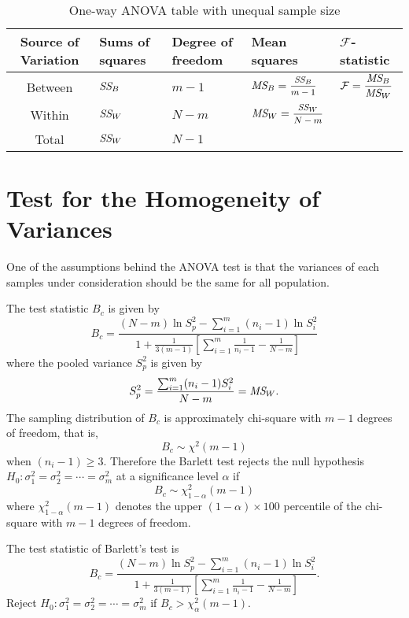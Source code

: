 \begin{table}[h!]
\renewcommand{\arraystretch}{1.2}
\begin{tabularx}{\textwidth}{c|l l p{2.5cm} p{2.5cm}}
    Source of Variation & Sums of squares & Degree of freedom & Mean squares & $\mathcal{F}$-statistic \\[0.6em]
    \hline
    Between & $\textit{SS}_{B}$ & $m - 1$ & $\MS{B} = \mfrac{\CS{B}}{m-1}$ & $\displaystyle \mathcal{F} = \frac{\textit{MS}_{B} }{\textit{MS}_{W} }$ \\[0.6em]
    Within & $\textit{SS}_{W}$ & $N - m$ & $\MS{W} = \mfrac{\CS{W}}{N-m}$ & \\
    \hline
    Total & $\textit{SS}_{W}$ & $N - 1$ & & \\
\end{tabularx}
\caption{One-way ANOVA table with unequal sample size}
\end{table}

\section{Test for the Homogeneity of Variances}

One of the assumptions behind the ANOVA test is that the variances 
of each samples under consideration should be the same for all population.

The test statistic $B_c$ is given by
\begin{equation}
    B_c = \frac{(N -m) \ln S^2_p - \sum^m_{i=1} (n_i - 1) \ln S^2_i }{\displaystyle 1 + \frac{1}{3(m-1)} 
    \left[ \sum^m_{i=1} \frac{1}{n_i - 1} - \frac{1}{N - m} \right]}
\end{equation}
where the pooled variance $S^2_p$ is given by
\begin{equation}
    S^2_p = \frac{\sum^m_{i=1} (n_i - 1) S^2_i}{N - m} = \textit{MS}_{W}.
\end{equation}
The sampling distribution of $B_c$ is approximately chi-square with $m - 1$ degrees of freedom, that is,
\[
    B_c \sim \chi^2 (m-1)
\]
when $(n_i - 1) \geq 3$. Therefore the Barlett test rejects the null hypothesis 
$H_0 : \sigma^2_1 = \sigma^2_2 = \cdots = \sigma^2_m$ at a significance level $\alpha$ if 
\[
    B_c \sim \chi^2_{1 - \alpha} (m-1)
\]
where $\chi^2_{1 - \alpha} (m-1)$ denotes the upper $(1 - \alpha) \times 100$ percentile of the chi-square 
with $m-1$ degrees of freedom.

\begin{definition}
    The test statistic of Barlett's test is 
    \begin{equation}
        B_c = \frac{(N -m) \ln S^2_p - \sum^m_{i=1} (n_i - 1) \ln S^2_i }{\displaystyle 1 + \frac{1}{3(m-1)} 
    \left[ \sum^m_{i=1} \frac{1}{n_i - 1} - \frac{1}{N - m} \right]}.
    \end{equation}
    Reject $H_0 : \sigma^2_1 = \sigma^2_2 = \cdots = \sigma^2_m$ if $B_c > \chi^2_\alpha(m-1)$.
\end{definition}